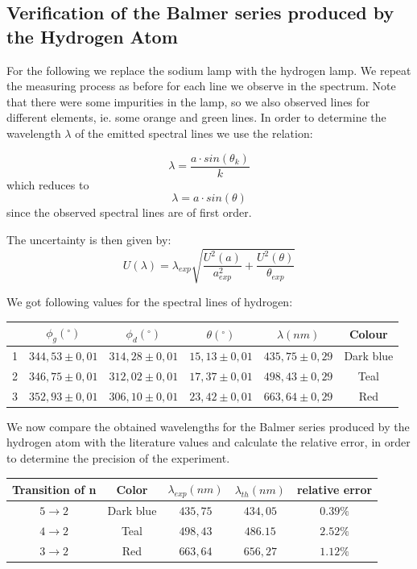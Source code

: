 \documentclass{scrartcl}
\begin{document}
\subsection{Verification of the Balmer series produced by the Hydrogen Atom}
For the following we replace the sodium lamp with the hydrogen lamp. We repeat the measuring process as before for each line we observe in the spectrum. Note that there were some impurities in the lamp, so we also observed lines for different elements, ie. some orange and green lines. In order to determine the wavelength $\lambda$ of the emitted spectral lines we use the relation:

\begin{equation} \nonumber
    \lambda = \frac{a\cdot sin(\theta_k)}{k}
\end{equation}
which reduces to
\begin{equation}
    \lambda = a\cdot sin(\theta)
\end{equation}
since the observed spectral lines are of first order.

The uncertainty is then given by:
\begin{equation}
    U(\lambda)= \lambda_{exp}\sqrt{\frac{U^2(a)}{a^2_{exp}}+\frac{U^2(\theta)}{\theta_{exp}}}
\end{equation}

We got following values for the spectral lines of hydrogen:

\medskip
\centering
\begin{tabular}{|c|c|c|c|c|c|}
    \hline
     & $\phi_g (^{\circ})$ & $\phi_d (^{\circ})$ & $\theta(^{\circ})$ & $\lambda (nm) $ & Colour \\
    \hline
    1 & $344,53 \pm 0,01$ & $314,28\pm 0,01$ & $15,13\pm 0,01$ & $435,75 \pm 0,29$ & Dark blue \\
    2 & $346,75\pm 0,01$ & $312,02\pm 0,01$ & $17,37\pm 0,01$ & $498,43 \pm 0,29$ & Teal \\
    3 & $352,93\pm 0,01$ & $306,10\pm 0,01$ & $23,42\pm 0,01$ & $663,64 \pm 0,29$ & Red \\
    \hline
\end{tabular}
\flushleft

We now compare the obtained wavelengths for the Balmer series produced by the hydrogen atom with the literature values and calculate the relative error, in order to determine the precision of the experiment.

\medskip
\centering
\begin{tabular}{|c|c|c|c|c|}
    \hline
     Transition of n & Color & $\lambda_{exp}(nm)$ & $\lambda_{th}(nm)$ & relative error\\
     \hline
     $5\rightarrow2$ &Dark blue & $435,75$ & $434,05$ & $0.39\%$ \\
     \hline
     $4\rightarrow2$ & Teal & $498,43$ & $486.15$ & $2.52\%$ \\
     \hline
     $3\rightarrow2$ & Red & $663,64$ & $656,27$ & $1.12\%$ \\
     \hline
     
\end{tabular}
\flushleft
\end{document}
